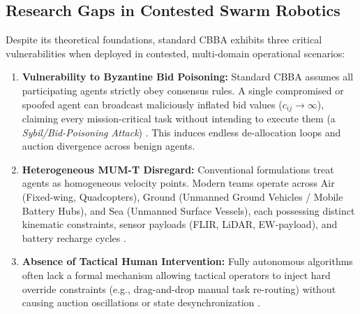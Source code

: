 \documentclass[journal,10pt,twocolumn]{IEEEtran}
\begin{document}
\subsection{Research Gaps in Contested Swarm Robotics}
Despite its theoretical foundations, standard CBBA exhibits three critical vulnerabilities when deployed in contested, multi-domain operational scenarios:
\begin{enumerate}
    \item \textbf{Vulnerability to Byzantine Bid Poisoning:} Standard CBBA assumes all participating agents strictly obey consensus rules. A single compromised or spoofed agent can broadcast maliciously inflated bid values ($c_{ij} \to \infty$), claiming every mission-critical task without intending to execute them (a \textit{Sybil/Bid-Poisoning Attack}) \cite{lamport1982byzantine, castro1999practical}. This induces endless de-allocation loops and auction divergence across benign agents.
    \item \textbf{Heterogeneous MUM-T Disregard:} Conventional formulations treat agents as homogeneous velocity points. Modern teams operate across Air (Fixed-wing, Quadcopters), Ground (Unmanned Ground Vehicles / Mobile Battery Hubs), and Sea (Unmanned Surface Vessels), each possessing distinct kinematic constraints, sensor payloads (FLIR, LiDAR, EW-payload), and battery recharge cycles \cite{gielis2022tactical, buckman2020adversarial}.
    \item \textbf{Absence of Tactical Human Intervention:} Fully autonomous algorithms often lack a formal mechanism allowing tactical operators to inject hard override constraints (e.g., drag-and-drop manual task re-routing) without causing auction oscillations or state desynchronization \cite{whitten2021decentralized, merrill2020distributed}.
\end{enumerate}
\end{document}
